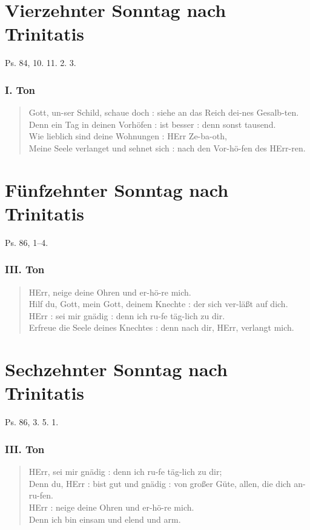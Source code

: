 \section{Vierzehnter Sonntag nach Trinitatis}

Ps. 84, 10. 11. 2. 3.

\subsubsection{I. Ton}
\begin{verse}
Gott, un-ser Schild, schaue doch : siehe an das Reich dei-nes Gesalb-ten.\\
Denn ein Tag in deinen Vorhöfen : ist besser : denn sonst tausend.\\
Wie lieblich sind deine Wohnungen : HErr Ze-ba-oth,\\
Meine Seele verlanget und sehnet sich : nach den Vor-hö-fen des HErr-ren.
\end{verse}

\section{Fünfzehnter Sonntag nach Trinitatis}

Ps. 86, 1–4.

\subsubsection{III. Ton}
\begin{verse}
HErr, neige deine Ohren und er-hö-re mich.\\
Hilf du, Gott, mein Gott, deinem Knechte : der sich ver-läßt auf dich.\\
HErr : sei mir gnädig : denn ich ru-fe täg-lich zu dir.\\
Erfreue die Seele deines Knechtes : denn nach dir, HErr, verlangt mich.
\end{verse}

\section{Sechzehnter Sonntag nach Trinitatis}

Ps. 86, 3. 5. 1.

\subsubsection{III. Ton}
\begin{verse}
HErr, sei mir gnädig : denn ich ru-fe täg-lich zu dir;\\
Denn du, HErr : bist gut und gnädig : von großer Güte, allen, die dich an-ru-fen.\\
HErr : neige deine Ohren und er-hö-re mich.\\
Denn ich bin einsam und elend und arm.
\end{verse}

